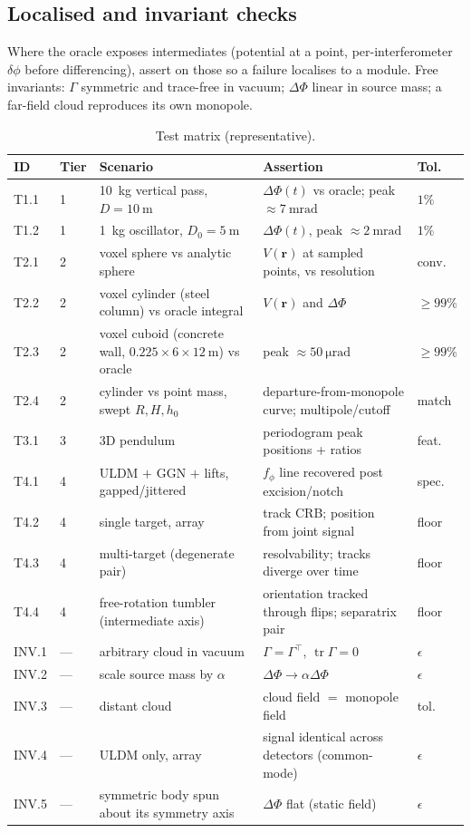 \documentclass[11pt,a4paper]{article}
\theoremstyle{reqstyle}
\newcommand{\rv}{\mathbf{r}}
\DeclareMathOperator{\tr}{tr}
\begin{document}
\subsection{Localised and invariant checks}
Where the oracle exposes intermediates (potential at a point, per-interferometer
$\delta\phi$ before differencing), assert on those so a failure localises to a module.
Free invariants: $\Gamma$ symmetric and trace-free in vacuum; $\Delta\Phi$ linear in source
mass; a far-field cloud reproduces its own monopole.

\begin{table}[h]
\centering
\caption{Test matrix (representative).}
\label{tab:tests}
\small
\begin{tabular}{@{}llp{}p{}l@{}}
\toprule
ID & Tier & Scenario & Assertion & Tol. \\
\midrule
T1.1 & 1 & \SI{10}{\kilogram} vertical pass, $D=\SI{10}{\metre}$ & $\Delta\Phi(t)$ vs oracle; peak $\approx\SI{7}{\milli\radian}$ & $1\%$ \\
T1.2 & 1 & \SI{1}{\kilogram} oscillator, $D_0=\SI{5}{\metre}$ & $\Delta\Phi(t)$, peak $\approx\SI{2}{\milli\radian}$ & $1\%$ \\
T2.1 & 2 & voxel sphere vs analytic sphere & $V(\rv)$ at sampled points, vs resolution & conv. \\
T2.2 & 2 & voxel cylinder (steel column) vs oracle integral & $V(\rv)$ and $\Delta\Phi$ & $\geq 99\%$ \\
T2.3 & 2 & voxel cuboid (concrete wall, $0.225\times 6\times\SI{12}{\metre}$) vs oracle & peak $\approx\SI{50}{\micro\radian}$ & $\geq 99\%$ \\
T2.4 & 2 & cylinder vs point mass, swept $R,H,h_0$ & departure-from-monopole curve; multipole/cutoff & match \\
T3.1 & 3 & 3D pendulum & periodogram peak positions + ratios & feat. \\
T4.1 & 4 & ULDM $+$ GGN $+$ lifts, gapped/jittered & $f_\phi$ line recovered post excision/notch & spec. \\
T4.2 & 4 & single target, array & track CRB; position from joint signal & floor \\
T4.3 & 4 & multi-target (degenerate pair) & resolvability; tracks diverge over time & floor \\
T4.4 & 4 & free-rotation tumbler (intermediate axis) & orientation tracked through flips; separatrix pair & floor \\
INV.1 & --- & arbitrary cloud in vacuum & $\Gamma=\Gamma^{\!\top}$, $\tr\Gamma=0$ & $\epsilon$ \\
INV.2 & --- & scale source mass by $\alpha$ & $\Delta\Phi\to\alpha\Delta\Phi$ & $\epsilon$ \\
INV.3 & --- & distant cloud & cloud field $=$ monopole field & tol. \\
INV.4 & --- & ULDM only, array & signal identical across detectors (common-mode) & $\epsilon$ \\
INV.5 & --- & symmetric body spun about its symmetry axis & $\Delta\Phi$ flat (static field) & $\epsilon$ \\
\bottomrule
\end{tabular}
\end{table}
\end{document}
